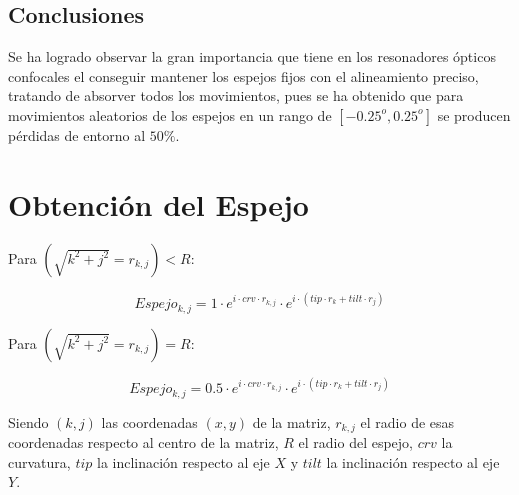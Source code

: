 \documentclass[twoside]{article}
\begin{document}
\begin{multicols}{2}
			\section{Conclusiones}

				Se ha logrado observar la gran importancia que tiene en los resonadores ópticos confocales el conseguir mantener los espejos fijos con el alineamiento preciso, tratando de absorver todos los movimientos, pues se ha obtenido que para movimientos aleatorios de los espejos en un rango de $[-0.25^o, 0.25^o]$ se producen pérdidas de entorno al $50\%$.

		\end{multicols}



		    \appendix

		    	\section{Obtención del Espejo}
		    		\label{appen:Espejo}

					Para  $(\sqrt{k^2+j^2}=r_{k,j}) < R$:

						\begin{equation}
							Espejo_{k, j} = 1 \cdot e^{i\cdot crv \cdot r_{k,j}} \cdot e^{i\cdot (tip\cdot r_k + tilt \cdot r_j)}
						\end{equation}
						
					Para $(\sqrt{k^2+j^2}=r_{k,j}) = R$:

						\begin{equation}
							Espejo_{k,j} = 0.5 \cdot e^{i\cdot crv \cdot r_{k,j}} \cdot e^{i\cdot (tip\cdot r_k + tilt \cdot r_j)}
							\label{eq:Espejo}
						\end{equation}	

					Siendo $(k, j)$ las coordenadas $(x, y)$ de la matriz, $r_{k, j}$ el radio de esas coordenadas respecto al centro de la matriz, $R$ el radio del espejo, $crv$ la curvatura, $tip$ la inclinación respecto al eje $X$ y $tilt$ la inclinación respecto al eje $Y$.
		    		

		
		

	
\end{document}
